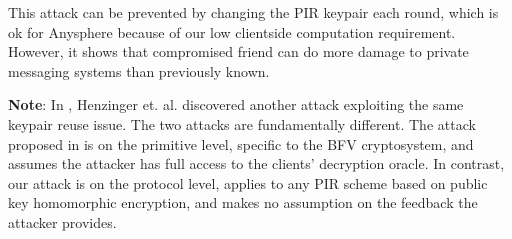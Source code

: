 This attack can be prevented by changing the PIR keypair each round, which is ok for Anysphere because of our low clientside computation requirement. However, it shows that compromised friend can do more damage to private messaging systems than previously known.

\textbf{Note}: In \cite{henry2022simplepir}, Henzinger et. al. discovered another attack exploiting the same keypair reuse issue. The two attacks are fundamentally different. The attack proposed in \cite{henry2022simplepir} is on the primitive level, specific to the BFV cryptosystem, and assumes the attacker has full access to the clients' decryption oracle. In contrast, our attack is on the protocol level, applies to any PIR scheme based on public key homomorphic encryption, and makes no assumption on the feedback the attacker provides.

